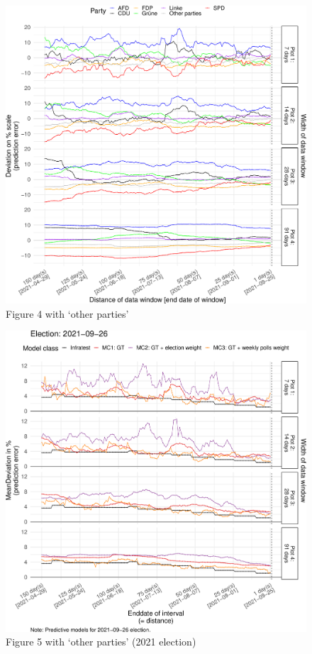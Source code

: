 \documentclass[
  letterpaper,
  DIV=11,
  numbers=noendperiod]{scrartcl}
\begin{document}
\begin{figure}[H]

\caption{\label{fig-A12}Figure 4 with `other parties'}

{\centering \includegraphics{figures/fig-A12-1.pdf}

}

\end{figure}

\begin{figure}[H]

\caption{\label{fig-A13}Figure 5 with `other parties' (2021 election)}

{\centering \includegraphics{figures/fig-A13-1.pdf}

}

\end{figure}
\end{document}
